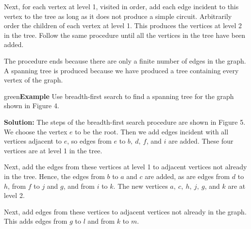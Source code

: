 \documentclass{article}
\newenvironment{example}{\begin{mybox}{green}{\textbf{Example}}}{\end{mybox}}
\begin{document}
Next, for each vertex at level 1, visited in order, add each edge incident to this vertex to the tree as long as it does not produce a simple circuit. Arbitrarily order the children of each vertex at level 1. This produces the vertices at level 2 in the tree. Follow the same procedure until all the vertices in the tree have been added. 

The procedure ends because there are only a finite number of edges in the graph. A spanning tree is produced because we have produced a tree containing every vertex of the graph.

\begin{example}
Use breadth-first search to find a spanning tree for the graph shown in Figure 4.

\textbf{Solution:}
The steps of the breadth-first search procedure are shown in Figure 5. We choose the vertex $e$ to be the root. Then we add edges incident with all vertices adjacent to $e$, so edges from $e$ to $b,\ d,\ f$, and $i$ are added. These four vertices are at level 1 in the tree. 

Next, add the edges from these vertices at level 1 to adjacent vertices not already in the tree. Hence, the edges from $b$ to $a$ and $c$ are added, as are edges from $d$ to $h$, from $f$ to $j$ and $g$, and from $i$ to $k$. The new
vertices $a,\ c,\ h,\ j,\ g$, and $k$ are at level 2.

Next, add edges from these vertices to adjacent vertices not already in the graph. This adds edges from $g$ to $l$ and from $k$ to $m$.
\end{example}
\end{document}
